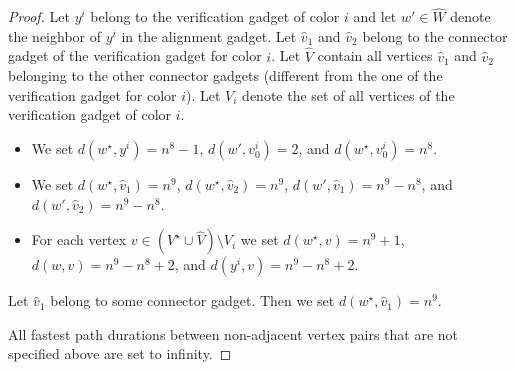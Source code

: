 \documentclass[a4paper,UKenglish,cleveref, autoref, thm-restate]{lipics-v2021}
\begin{document}
\begin{proof}
Let $y^i$ belong to the verification gadget of color $i$ and let $w'\in \hat{W}$ denote the neighbor of $y^i$ in the alignment gadget. Let $\hat{v}_1$ and $\hat{v}_2$ belong to the connector gadget of the verification gadget for color $i$. Let $\hat{V}$ contain all vertices $\hat{v}_1$ and $\hat{v}_2$ belonging to the other connector gadgets (different from the one of the verification gadget for color $i$). Let $V_i$ denote the set of all vertices of the verification gadget of color $i$.
\begin{itemize}
    \item We set $d(w^\star,y^i)=n^8-1$, $d(w',v^i_0)=2$, and $d(w^\star,v^i_0)=n^8$.
    \item We set $d(w^\star,\hat{v}_1)=n^9$, $d(w^\star,\hat{v}_2)=n^9$, $d(w',\hat{v}_1)=n^9-n^8$, and $d(w',\hat{v}_2)=n^9-n^8$.
    \item For each vertex $v\in (V^\star\cup \hat{V})\setminus V_i$ we set $d(w^\star,v)=n^9+1$, $d(w,v)=n^9-n^8+2$, and $d(y^i,v)=n^9-n^8+2$.
\end{itemize}
Let $\hat{v}_1$ belong to some connector gadget. Then we set $d(w^\star,\hat{v}_1)=n^9$.

All fastest path durations between non-adjacent vertex pairs that are not specified above are set to infinity.



\end{proof}
\end{document}
